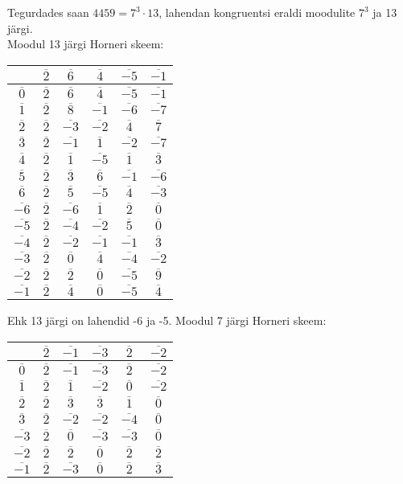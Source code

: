 \documentclass[a4paper, 10pt]{article}
\newcommand{\w}{\overline}
\begin{document}
\bigskip
Tegurdades saan $4459=7^3\cdot13$, lahendan kongruentsi eraldi moodulite $7^3$ ja 13 järgi.\\
Moodul 13 järgi Horneri skeem:\\
\begin{center}
\begin{tabular}{c|ccccc}
&$\w{2}$&$\w{6}$&$\w{4}$&$\w{-5}$&$\w{-1}$\\
\hline
$\w0$&$\w{2}$&$\w{6}$&$\w{4}$&$\w{-5}$&$\w{-1}$\\
$\w1$&$\w{2}$&$\w{8}$&$\w{-1}$&$\w{-6}$&$\w{-7}$\\
$\w2$&$\w{2}$&$\w{-3}$&$\w{-2}$&$\w{4}$&$\w{7}$\\
$\w3$&$\w{2}$&$\w{-1}$&$\w{1}$&$\w{-2}$&$\w{-7}$\\
$\w4$&$\w{2}$&$\w{1}$&$\w{-5}$&$\w{1}$&$\w{3}$\\
$\w5$&$\w{2}$&$\w{3}$&$\w{6}$&$\w{-1}$&$\w{-6}$\\
$\w6$&$\w{2}$&$\w{5}$&$\w{-5}$&$\w{4}$&$\w{-3}$\\
$\w{-6}$&$\w{2}$&$\w{-6}$&$\w{1}$&$\w{2}$&$\w{0}$\\
$\w{-5}$&$\w{2}$&$\w{-4}$&$\w{-2}$&$\w{5}$&$\w{0}$\\
$\w{-4}$&$\w{2}$&$\w{-2}$&$\w{-1}$&$\w{-1}$&$\w{3}$\\
$\w{-3}$&$\w{2}$&$\w{0}$&$\w{4}$&$\w{-4}$&$\w{-2}$\\
$\w{-2}$&$\w{2}$&$\w{2}$&$\w{0}$&$\w{-5}$&$\w{9}$\\
$\w{-1}$&$\w{2}$&$\w{4}$&$\w{0}$&$\w{-5}$&$\w{4}$\\
\end{tabular}
\bigskip
\end{center}
Ehk 13 järgi on lahendid -6 ja -5. Moodul 7 järgi Horneri skeem:\\
\begin{center}
\begin{tabular}{c|ccccc}
&$\w{2}$&$\w{-1}$&$\w{-3}$&$\w{2}$&$\w{-2}$\\
\hline
$\w0$&$\w{2}$&$\w{-1}$&$\w{-3}$&$\w{2}$&$\w{-2}$\\
$\w1$&$\w{2}$&$\w{1}$&$\w{-2}$&$\w{0}$&$\w{-2}$\\
$\w2$&$\w{2}$&$\w{3}$&$\w{3}$&$\w{1}$&$\w{0}$\\
$\w3$&$\w{2}$&$\w{-2}$&$\w{-2}$&$\w{-4}$&$\w{0}$\\
$\w{-3}$&$\w{2}$&$\w{0}$&$\w{-3}$&$\w{-3}$&$\w{0}$\\
$\w{-2}$&$\w{2}$&$\w{2}$&$\w{0}$&$\w{2}$&$\w{2}$\\
$\w{-1}$&$\w{2}$&$\w{-3}$&$\w{0}$&$\w{2}$&$\w{3}$\\
\end{tabular}
\bigskip
\end{center}
\end{document}

